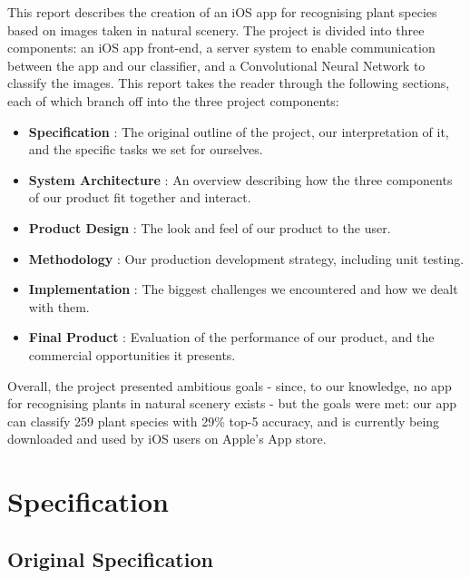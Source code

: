 \documentclass[a4paper,11pt]{article}
\begin{document}
This report describes the creation of an iOS app for recognising plant species based on images taken in natural scenery. The project is divided into three components: an iOS app front-end, a server system to enable communication between the app and our classifier, and a Convolutional Neural Network to classify the images. This report takes the reader through the following sections, each of which branch off into the three project components:
\begin{itemize}
 \item \textbf{Specification} : The original outline of the project, our interpretation of it, and the specific tasks we set for ourselves.
 \item \textbf{System Architecture} : An overview describing how the three components of our product fit together and interact.
 \item \textbf{Product Design} : The look and feel of our product to the user.
 \item \textbf{Methodology} : Our production development strategy, including unit testing.
 \item \textbf{Implementation} : The biggest challenges we encountered and how we dealt with them.
 \item \textbf{Final Product} : Evaluation of the performance of our product, and the commercial opportunities it presents.
\end{itemize}
 
Overall, the project presented ambitious goals - since, to our knowledge, no app for recognising plants in natural scenery exists - but the goals were met: our app can classify 259 plant species with 29\% top-5 accuracy, and is currently being downloaded and used by iOS users on Apple's App store.

\clearpage
\section{Specification}

\subsection{Original Specification}


\end{document}
